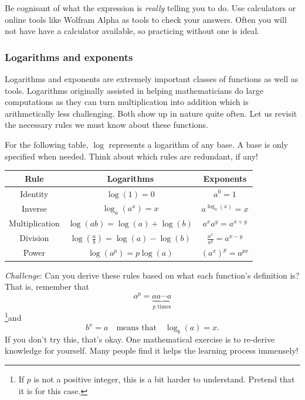     Be cognisant of what the expression is \emph{really} telling you to do.  Use calculators or online tools like Wolfram Alpha as tools to check your answers. Often you will not have have a calculator available, so practicing without one is ideal.
    
    \subsubsection{Logarithms and exponents}
    
    Logarithms and exponents are extremely important classes of functions as well as tools.  Logarithms originally assisted in helping mathematicians do large computations as they can turn multiplication into addition which is arithmetically less challenging.  Both show up in nature quite often.  Let us revisit the necessary rules we must know about these functions.
    
    For the following table, $\log$ represents a logarithm of any base.  A base is only specified when needed. Think about which rules are redundant, if any!
    \begin{table}[H]
        \centering
        \renewcommand{\arraystretch}{1.5}
        \begin{tabular}{c|c|c}
            Rule & Logarithms & Exponents\\
            \hline
            Identity & $\log(1)=0$ & $a^0=1$\\
            \hline
            Inverse & $\log_a\left(a^x\right)=x$ & $a^{\log_a(x)}=x$\\
            \hline
            Multiplication & $\log(ab)=\log(a)+\log(b)$ & $a^x a^y=a^{x+y}$ \\
            \hline
            Division & $\log\left(\frac{a}{b}\right)=\log(a)-\log(b)$ & $\frac{a^x}{a^y}=a^{x-y}$\\
            \hline
            Power & $\log(a^p)=p\log(a)$ & $\left(a^x\right)^p = a^{px}$
        \end{tabular}
        \label{tab:log_exp_rules}
    \end{table}
    \emph{Challenge}: Can you derive these rules based on what each function's definition is? That is, remember that
    \[
    a^p = \underbrace{aa\cdots a}_{p \textrm{~times}}
    \]
    \footnote{If $p$ is not a positive integer, this is a bit harder to understand. Pretend that it is for this case.}and
    \[
    b^x = a \quad \textrm{means that} \quad \log_b(a)=x.
    \]
    If you don't try this, that's okay.  One mathematical exercise is to re-derive knowledge for yourself. Many people find it helps the learning process immensely!
    
